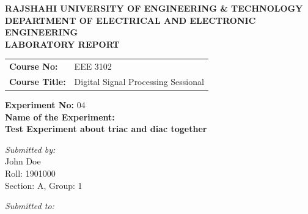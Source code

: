 \documentclass[12pt,a4paper]{article}
\begin{document}
\begin{titlepage}
    \sffamily
    \centering
    \vspace*{1cm}
    
    \Large \textbf{\MakeUppercase{ Rajshahi University of Engineering \& Technology }} \\
    \vspace{0.5cm}
    \large \textbf{\MakeUppercase{ Department of Electrical and Electronic Engineering }} \\
    
    \vspace{2.5cm}
    \Large \textbf{LABORATORY REPORT} \\
    \vspace{1cm}
    
    \begin{tabular}{ll}
        \textbf{Course No:} & EEE 3102 \\
        \textbf{Course Title:} & Digital Signal Processing Sessional \\
    \end{tabular}
    
    \vspace{2cm}
    
    \textbf{Experiment No:} 04 \\
    \vspace{0.5cm}
    \textbf{Name of the Experiment:} \\
    \Large \textbf{ Test Experiment about triac and diac together } \\
    
    \vspace{2.5cm}
    
    \begin{minipage}[t]{0.4\textwidth}
        \begin{flushleft} \large
            \emph{Submitted by:}\\
            John Doe \\
            Roll: 1901000 \\
            Section: A, Group: 1
        \end{flushleft}
    \end{minipage}
    \hfill
    \begin{minipage}[t]{0.5\textwidth}
        \begin{flushright} \large
            \emph{Submitted to:} \\
            

\end{flushright}
\end{minipage}
\end{titlepage}
\end{document}
